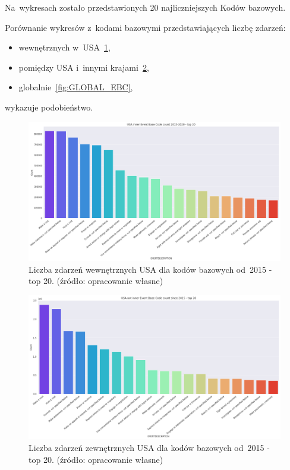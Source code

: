 \documentclass[11pt]{report}
\begin{document}
    Na~wykresach zostało przedstawionych 20 najliczniejszych Kodów bazowych.

    Porównanie wykresów z~kodami bazowymi przedstawiających liczbę zdarzeń:
    \begin{itemize}
        \item wewnętrznych w~USA~\ref{fig:USA_inner_EBC},
        \item pomiędzy USA i~innymi krajami~\ref{fig:USA_not_inner_EBC},
        \item globalnie~\ref{fig:GLOBAL_EBC},
    \end{itemize}
    wykazuje podobieństwo.

    \begin{figure}[tp]
        \centering
        \includegraphics[width=\linewidth]{fig/USA inner/EBC.png}
        \caption{Liczba zdarzeń wewnętrznych USA dla kodów bazowych od~2015 - top 20. (źródło: opracowanie własne)}
        \label{fig:USA_inner_EBC}
    \end{figure}


    \begin{figure}[tp]
        \centering
        \includegraphics[width=\linewidth]{fig/USA not inner/EBC.png}
        \caption{Liczba zdarzeń zewnętrznych USA dla kodów bazowych od~2015 - top 20. (źródło: opracowanie własne)}
        \label{fig:USA_not_inner_EBC}
    \end{figure}
\end{document}
